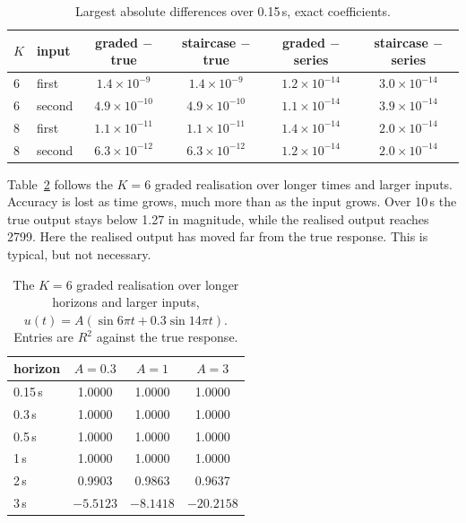 \documentclass[11pt,a4paper]{article}
\theoremstyle{remark}
\begin{document}
\begin{table}[t]\centering\small
\caption{Largest absolute differences over 0.15\,s, exact coefficients.}\label{tab:forward}
\begin{tabular}{llcccc}\toprule
$K$ & input & graded $-$ true & staircase $-$ true & graded $-$ series & staircase $-$ series\\\midrule
6 & first & $1.4\times10^{-9}$ & $1.4\times10^{-9}$ & $1.2\times10^{-14}$ & $3.0\times10^{-14}$\\
6 & second & $4.9\times10^{-10}$ & $4.9\times10^{-10}$ & $1.1\times10^{-14}$ & $3.9\times10^{-14}$\\
8 & first & $1.1\times10^{-11}$ & $1.1\times10^{-11}$ & $1.4\times10^{-14}$ & $2.0\times10^{-14}$\\
8 & second & $6.3\times10^{-12}$ & $6.3\times10^{-12}$ & $1.2\times10^{-14}$ & $2.0\times10^{-14}$\\
\bottomrule\end{tabular}
\end{table}

Table~\ref{tab:breakdown} follows the $K=6$ graded realisation over longer times and larger inputs.
Accuracy is lost as time grows, much more than as the input grows.
Over 10\,s the true output stays below 1.27 in magnitude, while the realised output reaches 2799.
Here the realised output has moved far from the true response. This is typical, but not necessary.

\begin{table}[t]\centering\small
\caption{The $K=6$ graded realisation over longer horizons and larger inputs, $u(t)=A(\sin 6\pi t+0.3\sin 14\pi t)$. Entries are $R^2$ against the true response.}\label{tab:breakdown}
\begin{tabular}{lccc}\toprule
horizon & $A=0.3$ & $A=1$ & $A=3$\\\midrule
0.15\,s & 1.0000 & 1.0000 & 1.0000\\
0.3\,s & 1.0000 & 1.0000 & 1.0000\\
0.5\,s & 1.0000 & 1.0000 & 1.0000\\
1\,s & 1.0000 & 1.0000 & 1.0000\\
2\,s & 0.9903 & 0.9863 & 0.9637\\
3\,s & $-5.5123$ & $-8.1418$ & $-20.2158$\\
\bottomrule\end{tabular}
\end{table}
\end{document}
